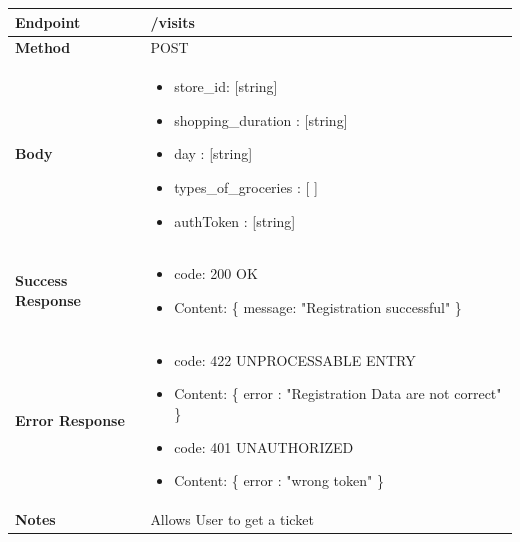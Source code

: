 \documentclass[a4paper, 12pt, oneside, table]{article}
\begin{document}
\begin{tabularx}{\linewidth}{| l | X |}
    
    \hline
     \textbf{Endpoint} & /visits \\
    

    \hline
    \textbf{Method}  & POST   \\
    
    \hline
    \textbf{Body}  & \parbox{0.7\textwidth}{ \begin{itemize}[label={}] 
                \item store\_id: [string]
                 \item shopping\_duration : [string]
                 \item day : [string]
                 \item types\_of\_groceries : [ ]
                 \item authToken : [string]
               \end{itemize}}\\
    
    \hline
    \textbf{Success Response} & \parbox{0.7\textwidth}{ \begin{itemize}[label={}] 
                \item code: 200 OK
                 \item Content: \{ message: "Registration successful" \}
               \end{itemize}}\\
    
    \hline
    
    \hline
        \textbf{Error Response} & \parbox{0.7\textwidth}{ \begin{itemize}[label={}] 
                \item code: 422 UNPROCESSABLE ENTRY
                 \item Content: \{ error : "Registration Data are not correct" \}
                  \item code: 401 UNAUTHORIZED
                 \item Content: \{ error : "wrong token" \}
               \end{itemize}}\\
    
    \hline
    \textbf{Notes} & Allows User to get a ticket \\

    \hline
    
\end{tabularx}
\end{document}
